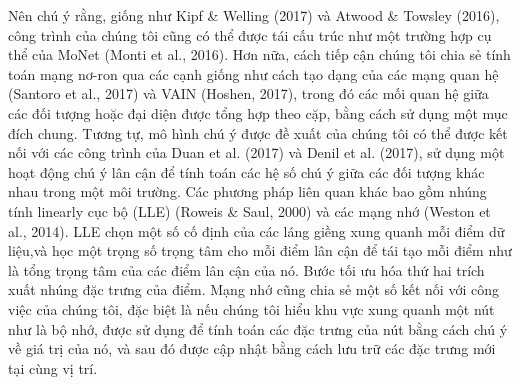 Nên chú ý rằng, giống như Kipf \& Welling (2017) và Atwood \& Towsley (2016), công trình của chúng tôi cũng có thể được tái cấu trúc như một trường hợp cụ thể của MoNet (Monti et al., 2016). Hơn nữa, cách tiếp cận chúng tôi chia sẻ tính toán mạng nơ-ron qua các cạnh giống như cách tạo dạng của các mạng quan hệ (Santoro et al., 2017) và VAIN (Hoshen, 2017), trong đó các mối quan hệ giữa các đối tượng hoặc đại diện được tổng hợp theo cặp, bằng cách sử dụng một mục đích chung. Tương tự, mô hình chú ý được đề xuất của chúng tôi có thể được kết nối với các công trình của Duan et al. (2017) và Denil et al. (2017), sử dụng một hoạt động chú ý lân cận để tính toán các hệ số chú ý giữa các đối tượng khác nhau trong một môi trường. Các phương pháp liên quan khác bao gồm nhúng tính linearly cục bộ (LLE) (Roweis \& Saul, 2000) và các mạng nhớ (Weston et al., 2014). LLE chọn một số cố định của các láng giềng xung quanh mỗi điểm dữ liệu,và học một trọng số trọng tâm cho mỗi điểm lân cận để tái tạo mỗi điểm như là tổng trọng tâm của các điểm lân cận của nó. Bước tối ưu hóa thứ hai trích xuất nhúng đặc trưng của điểm. Mạng nhớ cũng chia sẻ một số kết nối với công việc của chúng tôi, đặc biệt là nếu chúng tôi hiểu khu vực xung quanh một nút như là bộ nhớ, được sử dụng để tính toán các đặc trưng của nút bằng cách chú ý về giá trị của nó, và sau đó được cập nhật bằng cách lưu trữ các đặc trưng mới tại cùng vị trí. 